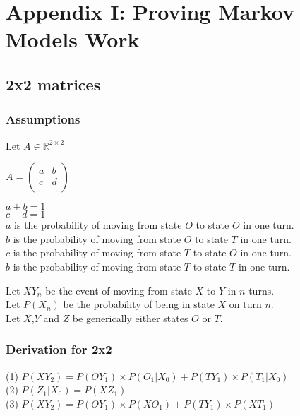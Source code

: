 \section{Appendix I: Proving Markov Models Work}
\subsection{2x2 matrices}
\subsubsection{Assumptions}

Let $A \in \mathbb{R}^{2\times2}$

$A =
\begin{pmatrix}
  a & b\\
  c & d\\
\end{pmatrix}
$

$a+b=1$\\
$c+d=1$\\
$a$ is the probability of moving from state $O$ to state $O$ in one turn.\\
$b$ is the probability of moving from state $O$ to state $T$ in one turn.\\
$c$ is the probability of moving from state $T$ to state $O$ in one turn.\\
$b$ is the probability of moving from state $T$ to state $T$ in one turn.

Let $XY_n$ be the event of moving from state $X$ to $Y$ in $n$ turns. \\
Let $P(X_n)$ be the probability of being in state $X$ on turn $n$.\\
Let $X$,$Y$ and $Z$ be generically either states $O$ or $T$.

\subsubsection{Derivation for 2x2}

(1) $P(XY_2) = P(OY_1) \times P(O_1|X_0)+P(TY_1) \times P(T_1|X_0)$\\
(2) $P(Z_1|X_0) = P(XZ_1)$\\
(3) $P(XY_2) = P(OY_1) \times P(XO_1)+P(TY_1) \times P(XT_1)$


